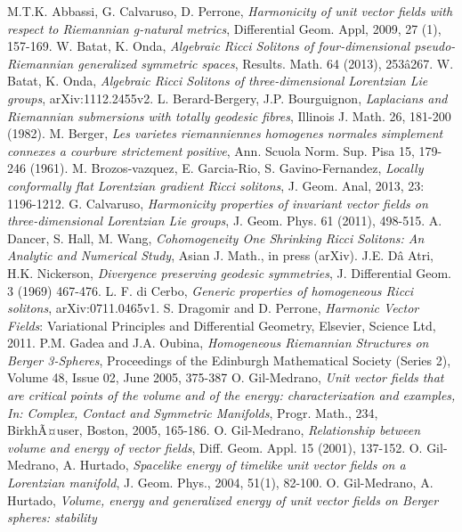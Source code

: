 \documentclass[11pt,oneside,leqno]{amsart}
\theoremstyle{plain}
\begin{document}
\begin{thebibliography}{99}
 M.T.K. Abbassi, G. Calvaruso, D. Perrone, {\em Harmonicity of unit vector fields with respect to Riemannian g-natural
metrics}, Differential Geom. Appl, 2009, 27 (1), 157-169.
 W. Batat, K. Onda,  {\em Algebraic Ricci Solitons of four-dimensional pseudo-
Riemannian generalized symmetric spaces}, Results. Math. 64 (2013), 253â267.
 W. Batat, K. Onda,  {\em Algebraic Ricci Solitons of three-dimensional Lorentzian
Lie groups}, arXiv:1112.2455v2.
  L. Berard-Bergery, J.P. Bourguignon, {\em Laplacians and Riemannian submersions
with totally geodesic fibres}, Illinois J. Math. 26, 181-200 (1982).
 M. Berger,  {\em Les varietes riemanniennes homogenes normales simplement connexes
a courbure strictement positive}, Ann. Scuola Norm. Sup. Pisa 15, 179-246 (1961).
 M. Brozos-vazquez, E. Garcia-Rio, S. Gavino-Fernandez,  {\em Locally conformally flat Lorentzian gradient Ricci solitons}, J. Geom. Anal, 2013, 23: 1196-1212.
 G. Calvaruso, {\em Harmonicity properties of invariant vector fields on three-dimensional Lorentzian Lie groups}, J. Geom. Phys. 61 (2011), 498-515.
 A. Dancer, S. Hall, M. Wang,  {\em Cohomogeneity One Shrinking Ricci Solitons: An Analytic and Numerical Study}, Asian J. Math., in press (arXiv).
 J.E. Dâ Atri, H.K. Nickerson,  {\em Divergence preserving geodesic symmetries}, J. Differential Geom. 3 (1969) 467-476.
 L. F. di Cerbo, {\em Generic properties of homogeneous Ricci solitons}, arXiv:0711.0465v1.
 S. Dragomir and D. Perrone, {\em Harmonic Vector Fields}: Variational Principles and
Differential Geometry, Elsevier, Science Ltd, 2011.
 P.M. Gadea and J.A. Oubina,  {\em Homogeneous Riemannian Structures on Berger 3-Spheres}, Proceedings of the Edinburgh Mathematical Society (Series 2), Volume 48, Issue 02,  June 2005, 375-387
  O. Gil-Medrano, {\em Unit vector fields that are critical points of the volume and of the energy: characterization and examples, In: Complex, Contact and Symmetric Manifolds}, Progr. Math., 234, BirkhÃ¤user, Boston, 2005, 165-186.
  O. Gil-Medrano, {\em Relationship between volume and energy of vector fields}, Diff. Geom.
Appl. 15 (2001), 137-152.
 O. Gil-Medrano, A. Hurtado, {\em Spacelike energy of timelike unit vector fields on a Lorentzian manifold}, J. Geom. Phys., 2004, 51(1), 82-100.
 O. Gil-Medrano, A. Hurtado, {\em Volume, energy and generalized energy of unit vector fields on Berger spheres: stability
}
\end{thebibliography}
\end{document}
